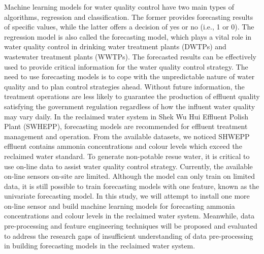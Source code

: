 Machine learning models for water quality control have two main types of algorithms, regression and classification. The former provides forecasting results of specific values, while the latter offers a decision of yes or no (i.e., 1 or 0). The regression model is also called the forecasting model, which plays a vital role in water quality control in drinking water treatment plants (DWTPs) and wastewater treatment plants (WWTPs). The forecasted results can be effectively used to provide critical information for the water quality control strategy. The need to use forecasting models is to cope with the unpredictable nature of water quality and to plan control strategies ahead. Without future information, the treatment operations are less likely to guarantee the production of effluent quality satisfying the government regulation \cite{chenAssessingWastewaterReclamation2003} regardless of how the influent water quality may vary daily. In the reclaimed water system in Shek Wu Hui Effluent Polish Plant (SWHEPP), forecasting models are recommended for effluent treatment management and operation. From the available datasets, we noticed SHWEPP effluent contains ammonia concentrations and colour levels which exceed the reclaimed water standard. To generate non-potable resue water, it is critical to use on-line data to assist water quality control strategy. Currently, the available on-line sensors on-site are limited. Although the model can only train on limited data, it is still possible to train forecasting models with one feature, known as the univariate forecasting model. In this study, we will attempt to install one more on-line sensor and build machine learning models for forecasting ammonia concentrations and colour levels in the reclaimed water system. Meanwhile, data pre-processing and feature engineering techniques will be proposed and evaluated to address the research gaps of insufficient understanding of data pre-processing in building forecasting models in the reclaimed water system.




